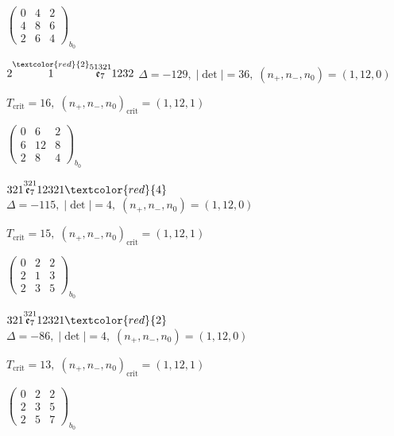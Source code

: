 \documentclass[10pt]{article}
\begin{document}
\hspace{2em}$\left(\begin{smallmatrix}0 & 4 & 2 \\ 4 & 8 & 6 \\ 2 & 6 & 4\end{smallmatrix}\right)_{\!b_0}$

\smallskip

$2\overset{\textcolor{red}{2}}{1}\overset{51321}{\mathfrak{e}_7}1232$ \quad $\Delta=-129,\; |\det|=36,\; (n_+,n_-,n_0)=(1,12,0)$

\hspace{1em}$T_{\text{crit}}=16,\; (n_+,n_-,n_0)_{\text{crit}}=(1,12,1)$

\hspace{2em}$\left(\begin{smallmatrix}0 & 6 & 2 \\ 6 & 12 & 8 \\ 2 & 8 & 4\end{smallmatrix}\right)_{\!b_0}$

\smallskip

$321\overset{321}{\mathfrak{e}_7}12321\textcolor{red}{4}$ \quad $\Delta=-115,\; |\det|=4,\; (n_+,n_-,n_0)=(1,12,0)$

\hspace{1em}$T_{\text{crit}}=15,\; (n_+,n_-,n_0)_{\text{crit}}=(1,12,1)$

\hspace{2em}$\left(\begin{smallmatrix}0 & 2 & 2 \\ 2 & 1 & 3 \\ 2 & 3 & 5\end{smallmatrix}\right)_{\!b_0}$

$321\overset{321}{\mathfrak{e}_7}12321\textcolor{red}{2}$ \quad $\Delta=-86,\; |\det|=4,\; (n_+,n_-,n_0)=(1,12,0)$

\hspace{1em}$T_{\text{crit}}=13,\; (n_+,n_-,n_0)_{\text{crit}}=(1,12,1)$

\hspace{2em}$\left(\begin{smallmatrix}0 & 2 & 2 \\ 2 & 3 & 5 \\ 2 & 5 & 7\end{smallmatrix}\right)_{\!b_0}$

\smallskip
\end{document}
